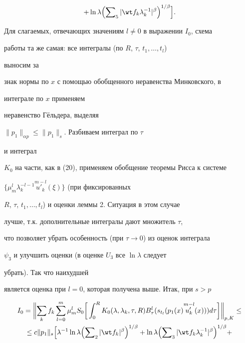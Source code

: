 {\begin{multline}
+\ln\lambda\Bigl(\sumn_5|\wt f_k\lambda^{-1}_k|^\beta


\Bigr)^{1/\beta}\Bigr].


\end{multline}





Для слагаемых, отвечающих значениям $l\ne 0$ в выражении $I_0$, схема


работы та же самая: все интегралы (по $R$, $\tau$, $t_1,\dotsc,t_l$)


выносим за


знак нормы по $x$ с помощью обобщенного неравенства Минковского, в


интеграле по $x$ применяем


неравенство Г\"ельдера, выделяя


$\|p_1\|_{\alpha p}\le\|p_1\|_s$. Разбиваем интеграл по $\tau$


и интеграл


$K_0$ на части, как в (20), применяем обобщение теоремы Рисса к системе


$\{\mu^l_m\lambda^{-l-1}_k\overset{m-l}{u'_k}(\xi)\}$ (при фиксированных


$R$, $\tau$, $t_1,\dotsc,t_l$) и оценки леммы 2. Ситуация в этом случае


лучше, т.к. дополнительные интегралы дают множитель $\tau$,


что позволяет убрать особенность (при $\tau\to 0$) из оценок интеграла


$\psi_3$ и улучшить оценки (в оценке $U_3$ все $\ln\lambda$ следует


убрать). Так что наихудшей


является оценка при $l=0$, которая получена выше. Итак, при $s>p$


\begin{multline}


I_0=\biggl\|\sum_k f_k\sum^m_{l=0}\mu^l_m S_0\biggl[\,


\int^R_0 K_0(\lambda,\lambda_k,\tau,R)B^l_\tau


(s_{t_l}(p_1(x)\overset{m-l}{u'_k}(x)))d\tau\biggr]


\biggr\|_{p,K} \le \\


\le c\|p_1\|_s\Bigl[\lambda^{-1}\ln\lambda\Bigl(\sumn_2


|\wt f_k|^\beta\Bigr)^{1/\beta}+\ln\lambda\Bigl(


\sumn_3|\wt f_k\lambda^{-1}_k|^\beta\Bigr)^{1/\beta}+\\



\end{multline}}
